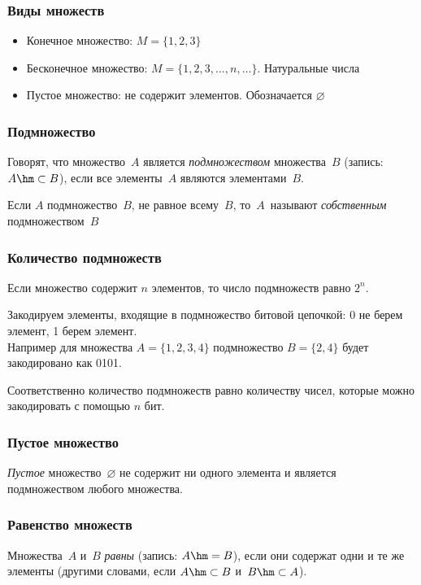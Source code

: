 \begin{frame}
\frametitle{Виды множеств}

\begin{itemize}
	\item Конечное множество: $M=\{1,2,3\}$
	\item Бесконечное множество: $M=\{1,2,3,\ldots,n,\ldots\}$. Натуральные числа
	\item Пустое множество: не содержит элементов. Обозначается $\varnothing$
\end{itemize}
\end{frame}


\begin{frame}
\frametitle{Подмножество}

Говорят, что множество~$A$ является \emph{подмножеством}
множества~$B$ (запись: $A\hm\subset B$),
если все элементы~$A$ являются элементами~$B$.

Если $A$ подмножество~$B$, не равное всему~$B$, то~$A$~называют
\emph{собственным} подмножеством~$B$


\end{frame}

\begin{frame}
\frametitle{Количество подмножеств}

Если множество содержит $n$ элементов, то число подмножеств равно $2^n$.

Закодируем элементы, входящие в подмножество битовой цепочкой: 0 не берем элемент, 1 берем элемент.\\
Например для множества  $A=\{1,2,3,4 \}$ подмножество $B=\{2,4\}$ будет закодировано как 0101.

Соответственно количество подмножеств равно количеству чисел, которые можно закодировать с помощью $n$ бит.



\end{frame}

\begin{frame}
\frametitle{Пустое множество}

\emph{Пустое} 
множество~$\varnothing$ не содержит ни одного
элемента и является подмножеством любого множества.
\end{frame}


\begin{frame}
\frametitle{Равенство множеств}
Множества~$A$ и~$B$
\emph{равны} 
(запись: $A\hm=B$), если они
содержат одни и те же элементы (другими словами, если
$A\hm\subset B$ и~$B\hm\subset A$).

\end{frame}


